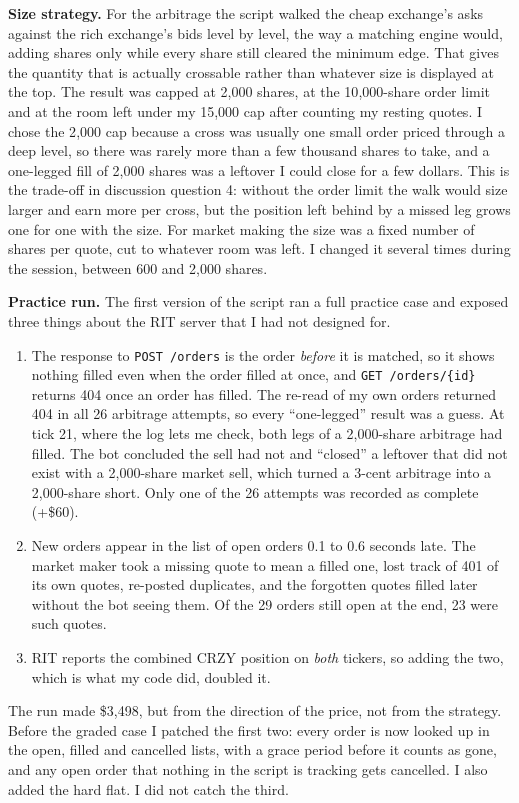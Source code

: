 \textbf{Size strategy.} For the arbitrage the script walked the cheap exchange's asks
against the rich exchange's bids level by level, the way a matching engine would,
adding shares only while every share still cleared the minimum edge. That gives the
quantity that is actually crossable rather than whatever size is displayed at the
top. The result was capped at 2{,}000 shares, at the 10{,}000-share order limit and
at the room left under my 15{,}000 cap after counting my resting quotes. I chose the
2{,}000 cap because a cross was usually one small order priced through a deep level,
so there was rarely more than a few thousand shares to take, and a one-legged fill
of 2{,}000 shares was a leftover I could close for a few dollars. This is the
trade-off in discussion question 4: without the order limit the walk would size
larger and earn more per cross, but the position left behind by a missed leg grows
one for one with the size. For market making the size was a fixed number of shares
per quote, cut to whatever room was left. I changed it several times during the
session, between 600 and 2{,}000 shares.

\textbf{Practice run.} The first version of the script ran a full practice case and
exposed three things about the RIT server that I had not designed for.
\begin{enumerate}
  \item The response to \texttt{POST /orders} is the order \emph{before} it is
        matched, so it shows nothing filled even when the order filled at once, and
        \texttt{GET /orders/\{id\}} returns 404 once an order has filled. The
        re-read of my own orders returned 404 in all 26 arbitrage attempts, so
        every ``one-legged'' result was a guess. At tick 21, where the log lets me
        check, both legs of a 2{,}000-share arbitrage had filled. The bot concluded
        the sell had not and ``closed'' a leftover that did not exist with a
        2{,}000-share market sell, which turned a 3-cent arbitrage into a
        2{,}000-share short. Only one of the 26 attempts was recorded as complete
        (+\$60).
  \item New orders appear in the list of open orders 0.1 to 0.6 seconds late. The
        market maker took a missing quote to mean a filled one, lost track of 401
        of its own quotes, re-posted duplicates, and the forgotten quotes filled
        later without the bot seeing them. Of the 29 orders still open at the end,
        23 were such quotes.
  \item RIT reports the combined CRZY position on \emph{both} tickers, so adding
        the two, which is what my code did, doubled it.
\end{enumerate}
The run made \$3{,}498, but from the direction of the price, not from the strategy.
Before the graded case I patched the first two: every order is now looked up in the
open, filled and cancelled lists, with a grace period before it counts as gone, and
any open order that nothing in the script is tracking gets cancelled. I also added
the hard flat. I did not catch the third.

